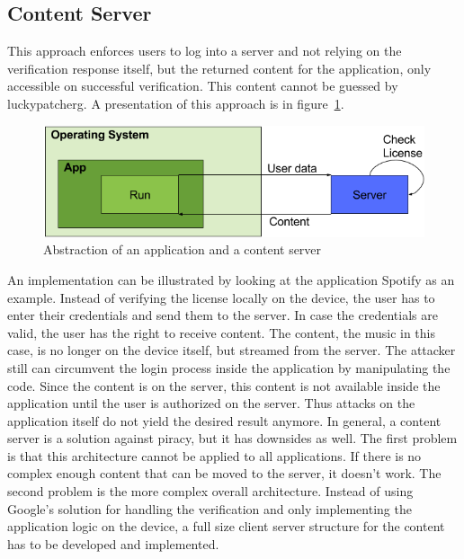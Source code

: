\newpage
\subsection{Content Server} \label{section:counter-replace-server}
This approach enforces users to log into a server and not relying on the verification response itself, but the returned content for the application, only accessible on successful verification.
This content cannot be guessed by \gls{luckypatcherg}.
A presentation of this approach is in figure~\ref{fig:contentServer}.
\newline
\begin{figure}[h]
    \centering
    \includegraphics[width=1\textwidth]{data/contentServer.png}
    \caption{Abstraction of an application and a content server}
    \label{fig:contentServer}
\end{figure}
\newline
An implementation can be illustrated by looking at the application Spotify \cite{spotify} as an example.
Instead of verifying the license locally on the device, the user has to enter their credentials and send them to the server.
In case the credentials are valid, the user has the right to receive content.
The content, the music in this case, is no longer on the device itself, but streamed from the server.
The attacker still can circumvent the login process inside the application by manipulating the code.
Since the content is on the server, this content is not available inside the application until the user is authorized on the server.
Thus attacks on the application itself do not yield the desired result anymore.
\newline
\newline
In general, a content server is a solution against piracy, but it has downsides as well.
The first problem is that this architecture cannot be applied to all applications.
If there is no complex enough content that can be moved to the server, it doesn't work.
\newline
The second problem is the more complex overall architecture.
Instead of using Google's solution for handling the verification and only implementing the application logic on the device, a full size client server structure for the content has to be developed and implemented.
